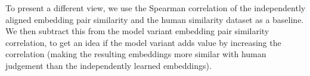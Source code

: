 
To present a different view, we use the Spearman correlation of the independently aligned embedding pair similarity and the human similarity dataset as a baseline. We then subtract this from the model variant embedding pair similarity correlation, to get an idea if the model variant adds value by increasing the correlation (making the resulting embeddings more similar with human judgement than the independently learned embeddings). 

\begin{table}[H]
\centering
\begin{tabular}{lrrrrrr}
  \toprule
  

\end{tabular}
\end{table}
